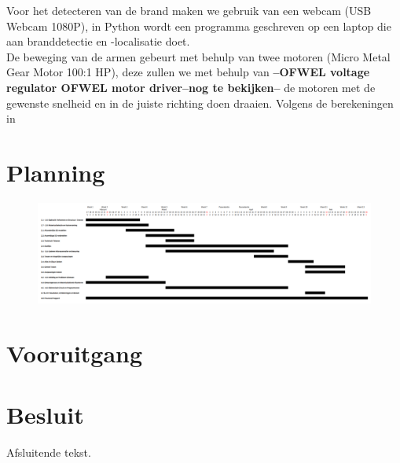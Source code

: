 \documentclass[kulak]{kulakarticle} %
\begin{document}
Voor het detecteren van de brand maken we gebruik van een webcam (USB Webcam 1080P), in Python wordt een programma geschreven op een laptop die aan branddetectie en -localisatie doet. \\

De beweging van de armen gebeurt met behulp van twee motoren (Micro Metal Gear Motor 100:1 HP), deze zullen we met behulp van {\bf{--OFWEL voltage regulator OFWEL motor driver--nog te bekijken--}} de motoren met de gewenste snelheid en in de juiste richting doen draaien. Volgens de berekeningen in 



\section{Planning}

\begin{figure} 
	\centering
	\includegraphics[width=1.45\textwidth, angle = 270 ]{ganttchart_LATEX}
\end{figure}


\section{Vooruitgang}


\section*{Besluit}

Afsluitende tekst.
\end{document}
